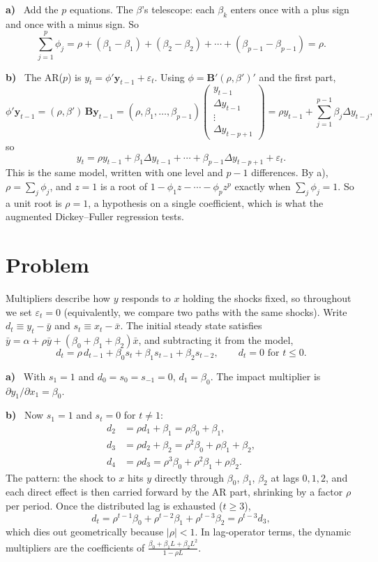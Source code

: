\documentclass[11pt]{article}
\newcommand{\symbf}[1]{\boldsymbol{#1}}
\newcounter{problem}
\renewcommand{\theproblem}{\arabic{problem}}
\newcommand{\problem}{
	\stepcounter{problem}
	\section*{Problem \theproblem}
}
\newcommand{\itm}[1]{\par\textbf{#1)}\ }
\begin{document}
\itm{a}
Add the $p$ equations. The $\beta$'s telescope: each $\beta_k$ enters once with a plus sign and once with a minus sign. So
\[
\sum_{j=1}^p\phi_j=\rho+(\beta_1-\beta_1)+(\beta_2-\beta_2)+\cdots+(\beta_{p-1}-\beta_{p-1})=\rho .
\]

\itm{b}
The AR($p$) is $y_t=\phi'\symbf y_{t-1}+\varepsilon_t$. Using $\phi=\symbf B'(\rho,\beta')'$ and the first part,
\[
\phi'\symbf y_{t-1}=(\rho,\beta')\,\symbf B\symbf y_{t-1}=(\rho,\beta_1,\dots,\beta_{p-1})\begin{pmatrix}y_{t-1}\\\Delta y_{t-1}\\\vdots\\\Delta y_{t-p+1}\end{pmatrix}=\rho y_{t-1}+\sum_{j=1}^{p-1}\beta_j\Delta y_{t-j},
\]
so
\[
y_t=\rho y_{t-1}+\beta_1\Delta y_{t-1}+\cdots+\beta_{p-1}\Delta y_{t-p+1}+\varepsilon_t .
\]
This is the same model, written with one level and $p-1$ differences. By a), $\rho=\sum_j\phi_j$, and $z=1$ is a root of $1-\phi_1z-\cdots-\phi_pz^p$ exactly when $\sum_j\phi_j=1$. So a unit root is $\rho=1$, a hypothesis on a single coefficient, which is what the augmented Dickey--Fuller regression tests.

\problem

Multipliers describe how $y$ responds to $x$ holding the shocks fixed, so throughout we set $\varepsilon_t=0$ (equivalently, we compare two paths with the same shocks). Write $d_t\equiv y_t-\bar y$ and $s_t\equiv x_t-\bar x$. The initial steady state satisfies $\bar y=\alpha+\rho\bar y+(\beta_0+\beta_1+\beta_2)\bar x$, and subtracting it from the model,
\[
d_t=\rho\,d_{t-1}+\beta_0s_t+\beta_1s_{t-1}+\beta_2s_{t-2},\qquad d_t=0\text{ for }t\le0 .
\]

\itm{a}
With $s_1=1$ and $d_0=s_0=s_{-1}=0$, $d_1=\beta_0$. The impact multiplier is $\partial y_1/\partial x_1=\beta_0$.

\itm{b}
Now $s_1=1$ and $s_t=0$ for $t\ne1$:
\[
\begin{aligned}
d_2&=\rho d_1+\beta_1=\rho\beta_0+\beta_1,\\
d_3&=\rho d_2+\beta_2=\rho^2\beta_0+\rho\beta_1+\beta_2,\\
d_4&=\rho d_3=\rho^3\beta_0+\rho^2\beta_1+\rho\beta_2 .
\end{aligned}
\]
The pattern: the shock to $x$ hits $y$ directly through $\beta_0$, $\beta_1$, $\beta_2$ at lags $0,1,2$, and each direct effect is then carried forward by the AR part, shrinking by a factor $\rho$ per period. Once the distributed lag is exhausted ($t\ge3$),
\[
d_t=\rho^{t-1}\beta_0+\rho^{t-2}\beta_1+\rho^{t-3}\beta_2=\rho^{t-3}d_3,
\]
which dies out geometrically because $|\rho|<1$. In lag-operator terms, the dynamic multipliers are the coefficients of $\frac{\beta_0+\beta_1L+\beta_2L^2}{1-\rho L}$.
\end{document}
